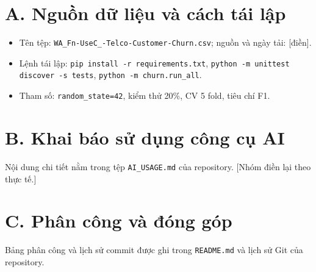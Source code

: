
\section*{A. Nguồn dữ liệu và cách tái lập}
\begin{itemize}
    \item Tên tệp: \texttt{WA\_Fn-UseC\_-Telco-Customer-Churn.csv}; nguồn và ngày tải: [điền].
    \item Lệnh tái lập: \texttt{pip install -r requirements.txt}, \texttt{python -m unittest discover -s tests},
    \texttt{python -m churn.run\_all}.
    \item Tham số: \texttt{random\_state=42}, kiểm thử 20\%, CV 5 fold, tiêu chí F1.
\end{itemize}

\section*{B. Khai báo sử dụng công cụ AI}
Nội dung chi tiết nằm trong tệp \texttt{AI\_USAGE.md} của repository. [Nhóm điền lại theo thực tế.]

\section*{C. Phân công và đóng góp}
Bảng phân công và lịch sử commit được ghi trong \texttt{README.md} và lịch sử Git của repository.
